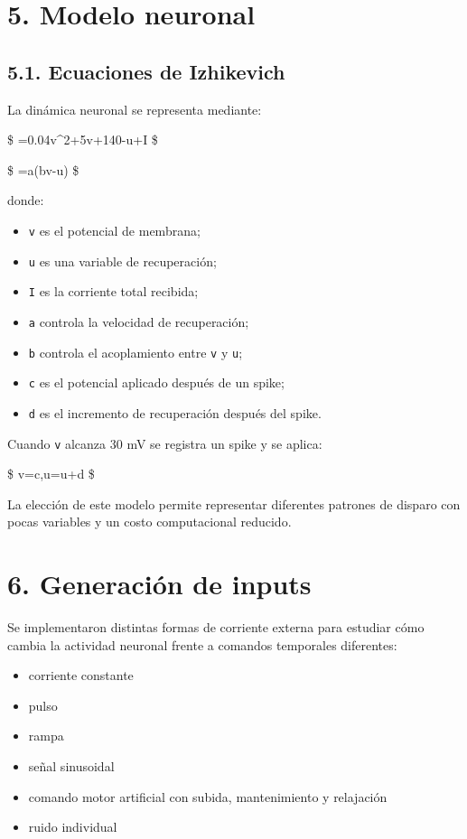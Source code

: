 \documentclass[11pt,a4paper]{article}
\providecommand{\tightlist}{%
  \setlength{\itemsep}{0pt}\setlength{\parskip}{0pt}}
\begin{document}
\hypertarget{modelo-neuronal}{%
\section{5. Modelo neuronal}\label{modelo-neuronal}}

\hypertarget{ecuaciones-de-izhikevich}{%
\subsection{5.1. Ecuaciones de
Izhikevich}\label{ecuaciones-de-izhikevich}}

La dinámica neuronal se representa mediante:

\$ =0.04v\^{}2+5v+140-u+I \$

\$ =a(bv-u) \$

donde:

\begin{itemize}
\tightlist
\item
  \texttt{v} es el potencial de membrana;
\item
  \texttt{u} es una variable de recuperación;
\item
  \texttt{I} es la corriente total recibida;
\item
  \texttt{a} controla la velocidad de recuperación;
\item
  \texttt{b} controla el acoplamiento entre \texttt{v} y \texttt{u};
\item
  \texttt{c} es el potencial aplicado después de un spike;
\item
  \texttt{d} es el incremento de recuperación después del spike.
\end{itemize}

Cuando \texttt{v} alcanza 30 mV se registra un spike y se aplica:

\$ v=c,\qquad u=u+d \$

La elección de este modelo permite representar diferentes patrones de
disparo con pocas variables y un costo computacional reducido.

\hypertarget{generaciuxf3n-de-inputs}{%
\section{6. Generación de inputs}\label{generaciuxf3n-de-inputs}}

Se implementaron distintas formas de corriente externa para estudiar
cómo cambia la actividad neuronal frente a comandos temporales
diferentes:

\begin{itemize}
\tightlist
\item
  corriente constante
\item
  pulso
\item
  rampa
\item
  señal sinusoidal
\item
  comando motor artificial con subida, mantenimiento y relajación
\item
  ruido individual
\end{itemize}
\end{document}
